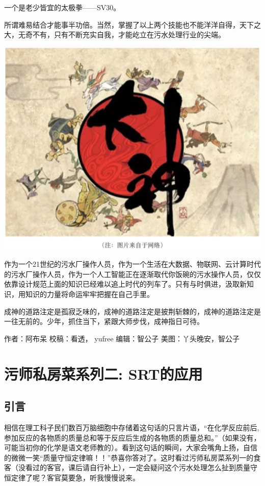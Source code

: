 \documentclass[]{book}
\begin{document}
一个是老少皆宜的太极拳------SV30。

所谓难易结合才能事半功倍。当然，掌握了以上两个技能也不能洋洋自得，天下之大，无奇不有，只有不断充实自我，才能屹立在污水处理行业的尖端。

\includegraphics[width=6.67in]{images/os4}

作为一个21世纪的污水厂操作人员，作为一个生活在大数据、物联网、云计算时代的污水厂操作人员，作为一个人工智能正在逐渐取代你饭碗的污水操作人员，仅仅依靠设计规范上面的知识已经难以追上时代的列车了。只有与时俱进，汲取新知识，用知识的力量将命运牢牢把握在自己手里。

成神的道路注定是孤寂乏味的，成神的道路注定是披荆斩棘的，成神的道路注定是一往无前的。少年，抓住当下，紧跟大师步伐，成神指日可待。

作者：阿布呆 校稿：看透， yufree 编辑：智公子 美图：丫头晚安，智公子

\section{污师私房菜系列二: SRT的应用}\label{-srt}

\subsection{引言}\label{-2}

相信在理工科子民们数百万脑细胞中存储着这句话的只言片语，``在化学反应前后,参加反应的各物质的质量总和等于反应后生成的各物质的质量总和。''（如果没有，可能当初你的化学是语文老师教的）。看到这句话的瞬间，大家会嘴角上扬，自信的微微一笑``质量守恒定律嘛！！''恭喜你答对了。这时看过污师私房菜系列一的食客（没看过的客官，课后请自行补上），一定会疑问这个污水处理怎么扯到质量守恒定律了呢？客官莫要急，听我慢慢说来。
\end{document}
